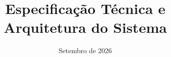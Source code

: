 \documentclass[consolidado]{modern-engsoft}
\title{Especificação Técnica e Arquitetura do Sistema}
\date{Setembro de 2026}
\begin{document}
\imprimircapa

\tableofcontents
\newpage
\listoffigures
\newpage
\listoftables
\newpage











\end{document}
